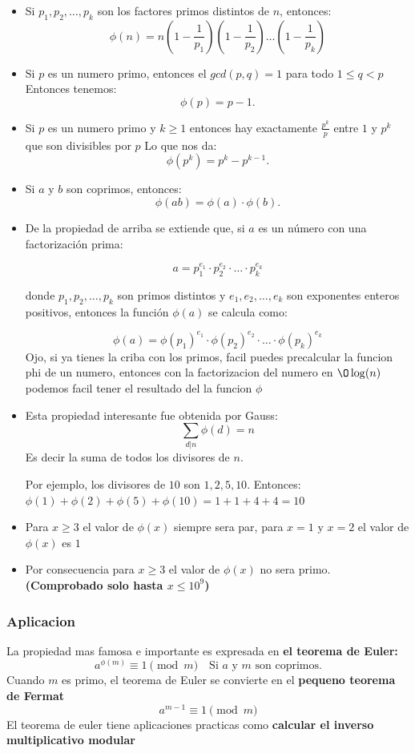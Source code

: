 \documentclass[12pt]{article}
\begin{document}
\begin{itemize}
    \item Si \( p_1, p_2, \dots, p_k \) son los factores primos distintos de \( n \), entonces:
    \[
    \phi(n) = n \left(1 - \frac{1}{p_1}\right) \left(1 - \frac{1}{p_2}\right) \dots \left(1 - \frac{1}{p_k}\right)
    \]
    \item Si \(p\) es un numero primo, entonces el \(gcd(p, q) = 1\) para todo \(1\leq q < p\) Entonces tenemos:
        \[
            \phi (p) = p - 1.
        \]
    \item Si \(p\) es un numero primo y \(k \geq 1\) entonces hay exactamente \(\frac{p^k}{p}\) entre \(1\) y \(p^k\) que son divisibles por \(p\) Lo que nos da:
     \[\phi(p^k) = p^k - p^{k-1}.\]
    \item Si \(a\) y \(b\) son coprimos, entonces:
    \[\phi(a b) = \phi(a) \cdot \phi(b).\]
    \item De la propiedad de arriba se extiende que, si \(a\) es un número con una factorización prima:

    \[
    a = p_1^{e_1} \cdot p_2^{e_2} \cdot \ldots \cdot p_k^{e_k}
    \]

    donde \(p_1, p_2, \ldots, p_k\) son primos distintos y \(e_1, e_2, \ldots, e_k\) son exponentes enteros positivos, entonces la función \(\phi(a)\) se calcula como:

    \[\phi(a) = \phi(p_1)^{e_1}\cdot \phi(p_2)^{e_2}\cdot \ldots \cdot \phi(p_k)^{e_k}\]
    Ojo, si ya tienes la criba con los primos, facil puedes precalcular la funcion phi de un numero, entonces con la factorizacion del numero en \(\O\log(n)\) podemos facil tener el resultado del la funcion \(\phi\)
    \item Esta propiedad interesante fue obtenida por Gauss:
     \[\sum_{d|n} \phi{(d)} = n\]
    Es decir la suma de todos los divisores de \(n\).
    
    Por ejemplo, los divisores de \(10\) son \(1, 2, 5, 10\). Entonces: \(\phi(1) + \phi(2) + \phi(5) +  \phi(10) = 1 + 1 + 4 + 4 = 10\)
    \item Para \(x \geq 3\) el valor de \(\phi (x)\) siempre sera par, para \(x = 1 \text{ y } x = 2\) el valor de \(\phi (x)\) es \(1\)
    \item Por consecuencia para \(x \geq 3\) el valor de \(\phi (x)\) no sera primo. \textbf{(Comprobado solo hasta \(x \leq 10^9\))} 
\end{itemize}
\subsubsection{Aplicacion}
La propiedad mas famosa e importante es expresada en \textbf{el teorema de Euler:}
\[a^{\phi(m)} \equiv 1 \pmod m \quad \text{Si } a \text{ y } m \text{ son coprimos.}\]
Cuando \(m\) es primo, el teorema de Euler se convierte en el \textbf{pequeno teorema de Fermat}
\[a^{m - 1} \equiv 1 \pmod m\]
El teorema de euler tiene aplicaciones practicas como \textbf{calcular el inverso multiplicativo modular} 
\end{document}
